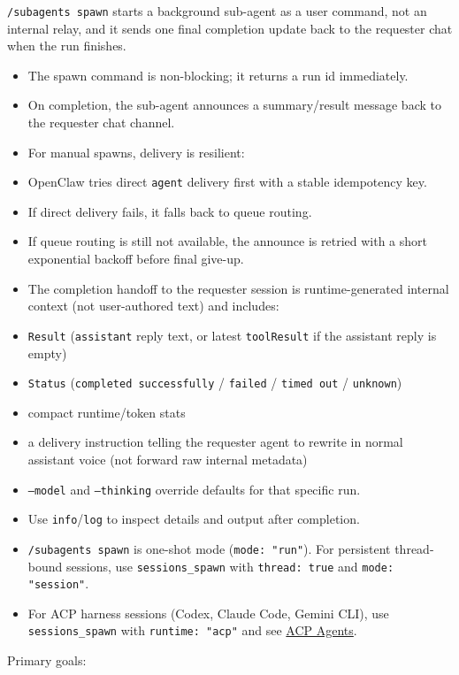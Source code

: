 \texttt{/subagents spawn} starts a background sub-agent as a user command, not an internal relay, and it sends one final completion update back to the requester chat when the run finishes.

\begin{itemize}
  \item The spawn command is non-blocking; it returns a run id immediately.
  \item On completion, the sub-agent announces a summary/result message back to the requester chat channel.
  \item For manual spawns, delivery is resilient:
  \item OpenClaw tries direct \texttt{agent} delivery first with a stable idempotency key.
  \item If direct delivery fails, it falls back to queue routing.
  \item If queue routing is still not available, the announce is retried with a short exponential backoff before final give-up.
  \item The completion handoff to the requester session is runtime-generated internal context (not user-authored text) and includes:
  \item \texttt{Result} (\texttt{assistant} reply text, or latest \texttt{toolResult} if the assistant reply is empty)
  \item \texttt{Status} (\texttt{completed successfully} / \texttt{failed} / \texttt{timed out} / \texttt{unknown})
  \item compact runtime/token stats
  \item a delivery instruction telling the requester agent to rewrite in normal assistant voice (not forward raw internal metadata)
  \item \texttt{--model} and \texttt{--thinking} override defaults for that specific run.
  \item Use \texttt{info}/\texttt{log} to inspect details and output after completion.
  \item \texttt{/subagents spawn} is one-shot mode (\texttt{mode: "run"}). For persistent thread-bound sessions, use \texttt{sessions\_spawn} with \texttt{thread: true} and \texttt{mode: "session"}.
  \item For ACP harness sessions (Codex, Claude Code, Gemini CLI), use \texttt{sessions\_spawn} with \texttt{runtime: "acp"} and see \href{/tools/acp-agents}{ACP Agents}.
\end{itemize}


Primary goals:

